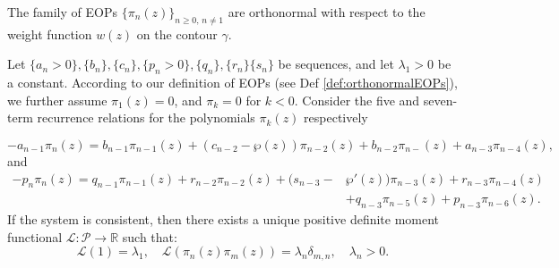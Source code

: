\documentclass[10pt,a4paper]{amsart}
\begin{document}
\begin{definition}\label{def:orthonormalEOPs}
 The family of EOPs \( \{\pi_n(z)\}_{n \geq 0,\, n \neq 1} \) are orthonormal with respect to the weight function \( w(z) \) on the contour \( \gamma \).
\end{definition}

\begin{theorem}
Let \( \{a_n>0\}, \{b_n\}, \{c_n\}, \{p_n>0\}, \{q_n\}, \{r_n\} \{s_n\}\) be sequences, and let \( \lambda_1>0 \) be a constant. According to our definition of EOPs (see Def \ref{def:orthonormalEOPs}), we further assume  $\pi_1(z)=0$, and $\pi_{k}=0$ for $k<0$. 
Consider the five and seven-term recurrence relations for the polynomials $\pi_k(z)$ respectively

\begin{equation}\label{5t}
   - a_{n-1} \pi_n(z) = b_{n-1} \pi_{n-1}(z) + (c_{n-2} - \wp(z)) \pi_{n-2}(z) + b_{n-2} \pi_{n-}(z) + a_{n-3} \pi_{n-4}(z),
\end{equation}
and
\begin{equation}\label{7t}
\begin{aligned}
-p_n \pi_n(z) = q_{n-1} \pi_{n-1}(z) + r_{n-2} \pi_{n-2}(z) + ( s_{n-3}-&\wp'(z)) \pi_{n-3}(z) + r_{n-3} \pi_{n-4}(z)\\& + q_{n-3} \pi_{n-5}(z) + p_{n-3} \pi_{n-6}(z).
\end{aligned}\end{equation}
 If the system is consistent, then there exists a unique positive definite moment functional \( \mathcal{L}: \mathcal{P} \to \mathbb{R} \) such that:
\[
\mathcal{L}(1) = \lambda_1, \quad \mathcal{L}(\pi_n(z) \pi_m(z)) = \lambda_n \delta_{m,n},
\quad \lambda_n>0.\]
\end{theorem}
\end{document}
